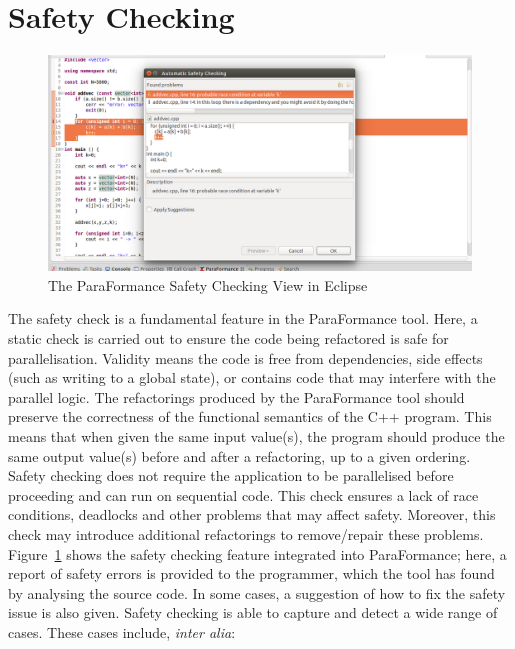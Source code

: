 %

\section{Safety Checking}
\begin{figure}
\centering
\includegraphics[scale=0.26]{figures/pf-safety-auto-dialog.png}
\caption{The ParaFormance Safety Checking View in Eclipse}
\label{fig:safety1}
\end{figure}

The safety check is a fundamental feature in the ParaFormance tool. Here, a static check is carried out to ensure the code being refactored is safe for parallelisation. Validity means the code is free from dependencies, side effects (such as writing to a global state), or contains code that may interfere with the parallel logic.
%
The refactorings produced by the ParaFormance tool should preserve the correctness of the functional semantics of the C++ program. This means that when given the same input value(s), the program should produce the same output value(s) before and after a refactoring, up to a given ordering.
%
Safety checking does not require the application to be parallelised before proceeding and can run on sequential code. This check ensures a lack of race conditions, deadlocks and other problems that may affect safety. Moreover, this check may introduce additional refactorings to remove/repair these problems. 
%
Figure~\ref{fig:safety1} shows the safety checking feature integrated into ParaFormance; here, a report of safety errors is provided to the programmer, which the tool has found by analysing the source code.
In some cases, a suggestion of how to fix the safety issue is also given. Safety checking is able to capture and detect a wide range of cases. These cases include, \textit{inter alia}:


